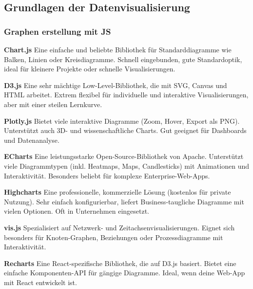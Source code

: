 \subsection{Grundlagen der Datenvisualisierung}
\label{subsec:grundlagen-der-datenvisualisierung}



\subsubsection{Graphen erstellung mit JS}


\textbf{Chart.js}
Eine einfache und beliebte Bibliothek für Standarddiagramme wie Balken, Linien
oder Kreisdiagramme. Schnell eingebunden, gute Standardoptik, ideal für
kleinere Projekte oder schnelle Visualisierungen.

\textbf{D3.js}
Eine sehr mächtige Low-Level-Bibliothek, die mit SVG, Canvas und HTML arbeitet.
Extrem flexibel für individuelle und interaktive Visualisierungen, aber mit
einer steilen Lernkurve.


\textbf{Plotly.js}
Bietet viele interaktive Diagramme (Zoom, Hover, Export als PNG). Unterstützt
auch 3D- und wissenschaftliche Charts. Gut geeignet für Dashboards und
Datenanalyse.


\textbf{ECharts}
Eine leistungsstarke Open-Source-Bibliothek von Apache. Unterstützt viele
Diagrammtypen (inkl. Heatmaps, Maps, Candlesticks) mit Animationen und
Interaktivität. Besonders beliebt für komplexe Enterprise-Web-Apps.

\textbf{Highcharts}
Eine professionelle, kommerzielle Lösung (kostenlos für private Nutzung). Sehr
einfach konfigurierbar, liefert Business-taugliche Diagramme mit vielen
Optionen. Oft in Unternehmen eingesetzt.

\textbf{vis.js}
Spezialisiert auf Netzwerk- und Zeitachsenvisualisierungen. Eignet sich
besonders für Knoten-Graphen, Beziehungen oder Prozessdiagramme mit
Interaktivität.

\textbf{Recharts}
Eine React-spezifische Bibliothek, die auf D3.js basiert.
Bietet eine einfache Komponenten-API für gängige Diagramme.
Ideal, wenn deine Web-App mit React entwickelt ist.


